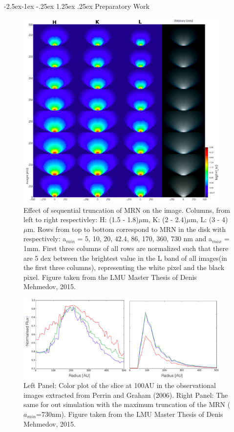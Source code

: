 \documentclass[10pt,fleqn,twoside]{article}
\makeatletter
\renewcommand\paragraph{\@startsection{paragraph}{4}{\z@}%
            {-2.5ex\@plus -1ex \@minus -.25ex}%
            {1.25ex \@plus .25ex}%
            {\normalfont\normalsize\bfseries}}
\makeatother
\begin{document}
\paragraph{Preparatory Work}


\begin{figure}
  \includegraphics[width=0.95\textwidth]{mrntruncation.pdf}
  \caption{Effect of sequential truncation of MRN on the image. Columns, from left to right respectivley: H:
(1.5 - 1.8)$\mu$m, K: (2 - 2.4)$\mu$m, L: (3 - 4)$\mu$m.
Rows from top to bottom correspond to MRN in the disk with respectively:
a$_{min}$ = 5, 10, 20, 42.4, 86, 170, 360, 730 nm and a$_{max}$ = 1mm. First three columns of all rows are
normalized such that there are 5 dex between the brightest value in the L band of all images(in the first three
columns), representing the white pixel and the black pixel. Figure
taken from the LMU Master Thesis of Denis Mehmedov, 2015. } 
  \label{fig:densitygrowth}
\end{figure}


\begin{figure}
  \includegraphics[width=0.95\textwidth]{colorinversion.pdf}
  \caption{Left Panel: Color plot of the slice
at 100AU in the observational images extracted from Perrin and Graham
(2006). Right Panel: The same for out simulation with the maximum
truncation of the MRN ($a_{min}$=730nm). Figure
taken from the LMU Master Thesis of Denis Mehmedov, 2015. } 
  \label{fig:colourgrowth}
\end{figure}
\end{document}
